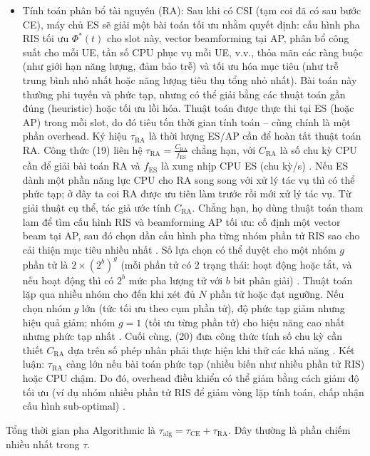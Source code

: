 \begin{itemize}
    \item Tính toán phân bổ tài nguyên (RA): Sau khi có CSI (tạm coi đã có sau bước CE), máy chủ ES sẽ giải một bài toán tối ưu nhằm quyết định: cấu hình pha RIS tối ưu $\Phi^*(t)$ cho slot này, vector beamforming tại AP, phân bổ công suất cho mỗi UE, tần số CPU phục vụ mỗi UE, v.v., thỏa mãn các ràng buộc (như giới hạn năng lượng, đảm bảo trễ) và tối ưu hóa mục tiêu (như trễ trung bình nhỏ nhất hoặc năng lượng tiêu thụ tổng nhỏ nhất). Bài toán này thường phi tuyến và phức tạp, nhưng có thể giải bằng các thuật toán gần đúng (heuristic) hoặc tối ưu lồi hóa. Thuật toán được thực thi tại ES (hoặc AP) trong mỗi slot, do đó tiêu tốn thời gian tính toán – cũng chính là một phần overhead. Ký hiệu $\tau_\text{RA}$ là thời lượng ES/AP cần để hoàn tất thuật toán RA. Công thức (19) liên hệ $\tau_\text{RA} = \frac{C_\text{RA}}{f_\text{ES}}$ chẳng hạn, với $C_\text{RA}$ là số chu kỳ CPU cần để giải bài toán RA và $f_\text{ES}$ là xung nhịp CPU ES (chu kỳ/s) . Nếu ES dành một phần năng lực CPU cho RA song song với xử lý tác vụ thì có thể phức tạp; ở đây ta coi RA được ưu tiên làm trước rồi mới xử lý tác vụ. Từ giải thuật cụ thể, tác giả ước tính $C_\text{RA}$. Chẳng hạn, họ dùng thuật toán tham lam để tìm cấu hình RIS và beamforming AP tối ưu: cố định một vector beam tại AP, sau đó chọn dần cấu hình pha từng nhóm phần tử RIS sao cho cải thiện mục tiêu nhiều nhất . Số lựa chọn có thể duyệt cho một nhóm $g$ phần tử là $2 \times (2^b)^g$ (mỗi phần tử có 2 trạng thái: hoạt động hoặc tắt, và nếu hoạt động thì có $2^b$ mức pha lượng tử với $b$ bit phân giải) . Thuật toán lặp qua nhiều nhóm cho đến khi xét đủ $N$ phần tử hoặc đạt ngưỡng. Nếu chọn nhóm $g$ lớn (tức tối ưu theo cụm phần tử), độ phức tạp giảm nhưng hiệu quả giảm; nhóm $g=1$ (tối ưu từng phần tử) cho hiệu năng cao nhất nhưng phức tạp nhất . Cuối cùng, (20) đưa công thức tính số chu kỳ cần thiết $C_\text{RA}$ dựa trên số phép nhân phải thực hiện khi thử các khả năng . Kết luận: $\tau_\text{RA}$ càng lớn nếu bài toán phức tạp (nhiều biến như nhiều phần tử RIS) hoặc CPU chậm. Do đó, overhead điều khiển có thể giảm bằng cách giảm độ tối ưu (ví dụ nhóm nhiều phần tử RIS để giảm vòng lặp tính toán, chấp nhận cấu hình sub-optimal) .
\end{itemize}

Tổng thời gian pha Algorithmic là $\tau_\text{alg} = \tau_\text{CE} + \tau_\text{RA}$. Đây thường là phần chiếm nhiều nhất trong $\tau$.

